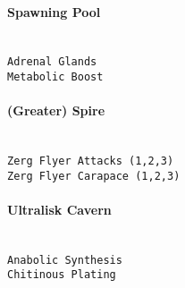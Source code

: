 \paragraph{Spawning Pool} \mbox{}\\
\verb|Adrenal Glands|\\
\verb|Metabolic Boost|

\paragraph{(Greater) Spire} \mbox{}\\
\verb|Zerg Flyer Attacks (1,2,3)|\\
\verb|Zerg Flyer Carapace (1,2,3)|

\paragraph{Ultralisk Cavern} \mbox{}\\
\verb|Anabolic Synthesis|\\
\verb|Chitinous Plating|